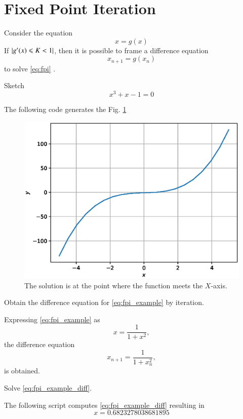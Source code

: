 \documentclass[journal,12pt,twocolumn]{IEEEtran}
\begin{document}
\section{Fixed Point Iteration}
\begin{theorem}
Consider the  equation 
\begin{equation}
\label{eq:fpi}
x = g(x)
\end{equation}
%
If $\left\vert g^{\prime}(x) \leqslant K < 1\right\vert$, then it is possible to frame a difference
equation
%
\begin{equation}
x_{n+1} = g(x_n)
\end{equation}
%
to solve \eqref{eq:fpi} \cite{kreyszig}.
\end{theorem}
%
\begin{problem}
Sketch
\begin{equation}
\label{eq:fpi_example}
x^3 + x - 1 =0
\end{equation}
%
\end{problem}
\solution The following code generates the Fig. \ref{fig:fpi_example}

\begin{figure}[!h]
\centering
\includegraphics[width=\columnwidth]{./figs/fpi_example.eps}
\caption{The solution is at the point where the function meets the $X$-axis.}
\label{fig:fpi_example}
\end{figure}

\begin{problem}
Obtain the difference equation for \eqref{eq:fpi_example}
%
by iteration.
\end{problem}
%
\solution  Expressing \eqref{eq:fpi_example} as
\begin{equation}
x  = \frac{1}{1+x^2},
\end{equation}
%
the difference equation
%
\begin{equation}
\label{eq:fpi_example_diff}
x_{n+1}  = \frac{1}{1+x_n^2},
\end{equation}
%
is obtained.
%
\begin{problem}
Solve \eqref{eq:fpi_example_diff}.
\end{problem}
%
\solution The following script computes \eqref{eq:fpi_example_diff} resulting in
\begin{equation}
x = 0.6823278038681895
\end{equation}

\end{document}
